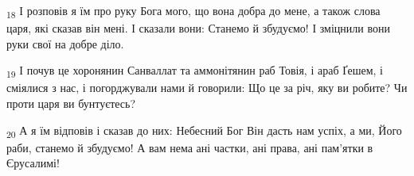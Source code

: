 \begin{tcolorbox}
\textsubscript{18} І розповів я їм про руку Бога мого, що вона добра до мене, а також слова царя, які сказав він мені. І сказали вони: Станемо й збудуємо! І зміцнили вони руки свої на добре діло.
\end{tcolorbox}
\begin{tcolorbox}
\textsubscript{19} І почув це хоронянин Санваллат та аммонітянин раб Товія, і араб Ґешем, і сміялися з нас, і погорджували нами й говорили: Що це за річ, яку ви робите? Чи проти царя ви бунтуєтесь?
\end{tcolorbox}
\begin{tcolorbox}
\textsubscript{20} А я їм відповів і сказав до них: Небесний Бог Він дасть нам успіх, а ми, Його раби, станемо й збудуємо! А вам нема ані частки, ані права, ані пам'ятки в Єрусалимі!
\end{tcolorbox}
